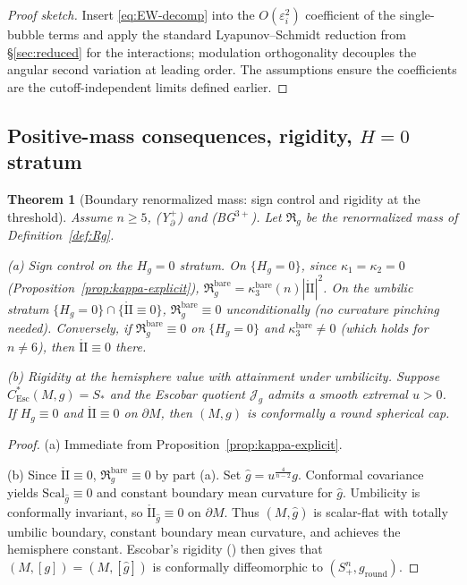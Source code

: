 \documentclass[11pt,reqno,a4paper]{amsart}
\numberwithin{equation}{section}
\theoremstyle{plain}
\newtheorem{theorem}{Theorem}[section]
\newcommand{\Scal}{\mathrm{Scal}}
\theoremstyle{remark}
\theoremstyle{plain}
\begin{document}
\begin{proof}[Proof sketch]
Insert \eqref{eq:EW-decomp} into the $O(\varepsilon_i^2)$ coefficient of the single-bubble terms and apply the standard Lyapunov--Schmidt reduction from \S\ref{sec:reduced} for the interactions; modulation orthogonality decouples the angular second variation at leading order. The assumptions ensure the coefficients are the cutoff-independent limits defined earlier.
\end{proof}

\subsection{Positive-mass consequences, rigidity, \texorpdfstring{$H = 0$}{H=0} stratum}

\begin{theorem}[Boundary renormalized mass: sign control and rigidity at the threshold]\label{thm:boundary-positive-mass-rigidity}
Assume $n\ge5$, \textup{(Y$^+_{\partial}$)} and \textup{(BG$^{3+}$)}. Let $\mathfrak R_g$ be the renormalized mass of Definition~\ref{def:Rg}.

\smallskip
\noindent\textup{(a) Sign control on the $H_g=0$ stratum.}
On $\{H_g=0\}$, since $\kappa_1=\kappa_2=0$ (Proposition~\ref{prop:kappa-explicit}),
$\mathfrak R_g^{\mathrm{bare}}=\kappa_3^{\mathrm{bare}}(n)|\mathring{\mathrm{II}}|^2$.
On the umbilic stratum $\{H_g=0\}\cap\{\mathring{\mathrm{II}}\equiv0\}$,
$\mathfrak R_g^{\mathrm{bare}}\equiv0$ unconditionally (no curvature pinching needed).
Conversely, if $\mathfrak R_g^{\mathrm{bare}}\equiv0$ on $\{H_g=0\}$ and $\kappa_3^{\mathrm{bare}}\neq0$ (which holds for $n\neq6$),
then $\mathring{\mathrm{II}}\equiv0$ there.


\smallskip
\noindent\textup{(b) Rigidity at the hemisphere value with attainment under umbilicity.}
Suppose $C^*_{\mathrm{Esc}}(M,g)=S_\ast$ and the Escobar quotient $\mathcal J_g$ admits a smooth extremal $u>0$.
If $H_g\equiv0$ and $\mathring{\mathrm{II}}\equiv0$ on $\partial M$, then $(M,g)$ is conformally a round spherical cap.
\end{theorem}

\begin{proof}
(a) Immediate from Proposition~\ref{prop:kappa-explicit}.

(b) Since $\mathring{\mathrm{II}}\equiv0$, $\mathfrak R_g^{\mathrm{bare}}\equiv0$ by part (a).
Set $\widehat g=u^{\frac{4}{n-2}}g$. Conformal covariance yields $\Scal_{\widehat g}\equiv0$ and constant boundary mean curvature for $\widehat g$.
Umbilicity is conformally invariant, so $\mathring{\mathrm{II}}_{\widehat g}\equiv0$ on $\partial M$.
Thus $(M,\widehat g)$ is scalar-flat with totally umbilic boundary, constant boundary mean curvature, and achieves the hemisphere constant. Escobar's rigidity (\cite{EscobarJDG92}) then gives that $(M,[g])=(M,[\widehat g])$ is conformally diffeomorphic to $(S^n_+,g_{\mathrm{round}})$.
\end{proof}
\end{document}
